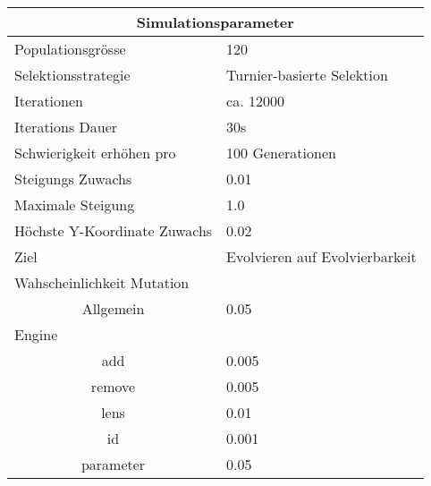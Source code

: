 
    \begin{tabular}{ | l | l | }
      \hline
      \multicolumn{2}{|c|}{Simulationsparameter} \\
      \hline
      Populationsgrösse & 120 \\ \hline
      Selektionsstrategie & Turnier-basierte Selektion \\ \hline
      Iterationen & ca. 12000 \\ \hline
      Iterations Dauer & 30s \\ \hline
      Schwierigkeit erhöhen pro & 100 Generationen \\ \hline
      Steigungs Zuwachs & 0.01 \\ \hline
      Maximale Steigung & 1.0 \\ \hline
      Höchste Y-Koordinate Zuwachs  & 0.02 \\ \hline
      Ziel & Evolvieren auf Evolvierbarkeit \\ \hline
      \multicolumn{2}{|l|}{Wahscheinlichkeit Mutation}\\ \hline
      \multicolumn{1}{|c|}{Allgemein} & 0.05 \\ \hline
      Engine &  \\ \hline
      \multicolumn{1}{|c|}{add} & 0.005 \\ \hline
      \multicolumn{1}{|c|}{remove} & 0.005 \\ \hline
      \multicolumn{1}{|c|}{lens} & 0.01 \\ \hline
      \multicolumn{1}{|c|}{id} & 0.001 \\ \hline
      \multicolumn{1}{|c|}{parameter} & 0.05 \\ \hline
    \end{tabular}
